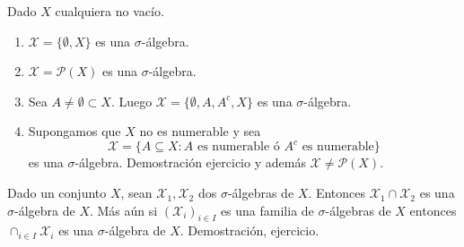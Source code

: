 \begin{eg}
    Dado $X$ cualquiera no vacío.
    \begin{enumerate}
        \item $\mathcal{X} = \{ \emptyset, X \}$ es una $\sigma$-álgebra.
        \item $\mathcal{X} = \mathcal{P}(X)$ es una $\sigma$-álgebra.
        \item Sea $A \neq \emptyset \subset X$. Luego $\mathcal{X} = \{ \emptyset, A, A^c, X \}$ es una $\sigma$-álgebra.
        \item Supongamos que $X$ no es numerable y sea
              \begin{equation}
                  \mathcal{X} = \{ A \subseteq X : A \text{ es numerable ó } A^c \text{ es numerable} \}
              \end{equation}
              es una $\sigma$-álgebra. Demostración ejercicio y además $\mathcal{X} \neq \mathcal{P}(X)$.
    \end{enumerate}
\end{eg}

\begin{lemma}
    Dado un conjunto $X$, sean $\mathcal{X}_1, \mathcal{X}_2$ dos $\sigma$-álgebras de $X$. Entonces $\mathcal{X}_1 \cap \mathcal{X}_2$ es una $\sigma$-álgebra de $X$.
    Más aún si $(\mathcal{X}_i)_{i \in I}$ es una familia de $\sigma$-álgebras de $X$ entonces $\cap_{i \in I} \mathcal{X}_i$ es una $\sigma$-álgebra de $X$.
    Demostración, ejercicio.
\end{lemma}

